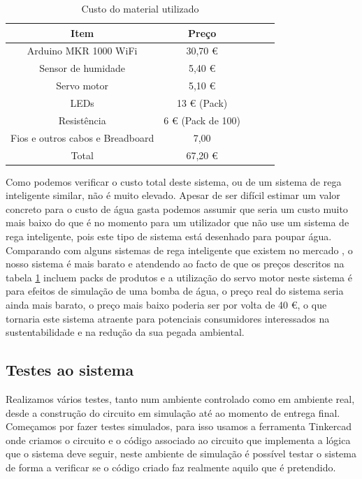\documentclass[conference]{IEEEtran}
\begin{document}
\begin{table}[ht]
\centering
\small
\begin{tabular}{|c|c|c|c|c|}
    \hline
    \rowcolor{gray}
    \color{white}Item & \color{white}Preço \\
    \hline
    Arduino MKR 1000 WiFi & 30,70 € \\
    \hline
    Sensor de humidade & 5,40 € \\
    \hline
    Servo motor & 5,10 € \\
    \hline
    LEDs & 13 € (Pack) \\
    \hline
    Resistência & 6 € (Pack de 100) \\
    \hline
    Fios e outros cabos e Breadboard & 7,00 \\
    \hline
    \rowcolor{gray}
    \color{white}Total & \color{white}67,20 € \\
    \hline
\end{tabular}
\vspace{1em}
\caption{Custo do material utilizado}
\label{pricetable}
\end{table}

Como podemos verificar o custo total deste sistema, ou de um sistema de 
rega inteligente similar, não é muito elevado. Apesar de ser difícil estimar 
um valor concreto para o custo de água gasta podemos assumir que seria um custo 
muito mais baixo do que é no momento para um utilizador que não use um sistema de 
rega inteligente, pois este tipo de sistema está desenhado para poupar água. 
Comparando com alguns sistemas de rega inteligente que existem no 
mercado \cite{amazonOrbit} \cite{amazonNetro}, o nosso sistema é mais barato e 
atendendo ao facto de que os preços descritos na tabela \ref{pricetable} incluem packs de 
produtos e a utilização do servo motor neste sistema é para efeitos de simulação 
de uma bomba de água, o preço real do sistema seria ainda mais barato, o preço mais 
baixo poderia ser por volta de 40 €, o que tornaria este sistema atraente para 
potenciais consumidores interessados na sustentabilidade e na redução da sua pegada 
ambiental.

\subsection{Testes ao sistema}

Realizamos vários testes, tanto num ambiente controlado como em ambiente real, desde 
a construção do circuito em simulação até ao momento de entrega final. Começamos 
por fazer testes simulados, para isso usamos a ferramenta Tinkercad \cite{tinkercad} onde 
criamos o circuito e o código associado ao circuito que implementa a lógica 
que o sistema deve seguir, neste ambiente de simulação é possível testar 
o sistema de forma a verificar se o código criado faz realmente aquilo 
que é pretendido.
\end{document}
